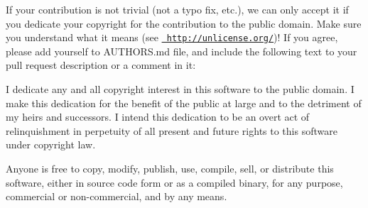 If your contribution is not trivial (not a typo fix, etc.), we can only accept it if you dedicate your copyright for the contribution to the public domain. Make sure you understand what it means (see \href{http://unlicense.org/}{\texttt{ http\+://unlicense.\+org/}})! If you agree, please add yourself to AUTHORS.\+md file, and include the following text to your pull request description or a comment in it\+:

 \begin{DoxyVerb}I dedicate any and all copyright interest in this software to the
public domain. I make this dedication for the benefit of the public at
large and to the detriment of my heirs and successors. I intend this
dedication to be an overt act of relinquishment in perpetuity of all
present and future rights to this software under copyright law.

Anyone is free to copy, modify, publish, use, compile, sell, or
distribute this software, either in source code form or as a compiled
binary, for any purpose, commercial or non-commercial, and by any
means.
\end{DoxyVerb}
 